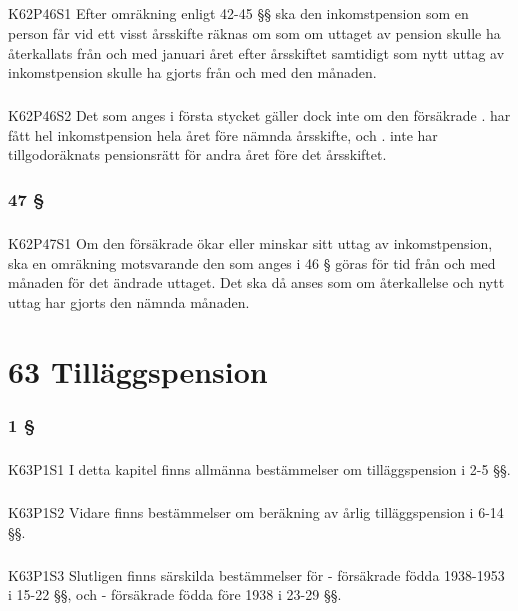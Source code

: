 \documentclass[a4paper,notitlepage,openany,10pt]{book}
\begin{document}
\paragraph*{}
{\tiny K62P46S1}
Efter omräkning enligt 42-45 §§ ska den inkomstpension som en person får vid ett visst årsskifte räknas om som om uttaget av pension skulle ha återkallats från och med januari året efter årsskiftet samtidigt som nytt uttag av inkomstpension skulle ha gjorts från och med den månaden.
\paragraph*{}
{\tiny K62P46S2}
Det som anges i första stycket gäller dock inte om den försäkrade
. har fått hel inkomstpension hela året före nämnda årsskifte, och
. inte har tillgodoräknats pensionsrätt för andra året före det årsskiftet.
\subsection*{47 §}
\paragraph*{}
{\tiny K62P47S1}
Om den försäkrade ökar eller minskar sitt uttag av inkomstpension, ska en omräkning motsvarande den som anges i 46 § göras för tid från och med månaden för det ändrade uttaget. Det ska då anses som om återkallelse och nytt uttag har gjorts den nämnda månaden.
\chapter*{63 Tilläggspension}
\subsection*{1 §}
\paragraph*{}
{\tiny K63P1S1}
I detta kapitel finns allmänna bestämmelser om tilläggspension i 2-5 §§.
\paragraph*{}
{\tiny K63P1S2}
Vidare finns bestämmelser om beräkning av årlig tilläggspension i 6-14 §§.
\paragraph*{}
{\tiny K63P1S3}
Slutligen finns särskilda bestämmelser för
\newline - försäkrade födda 1938-1953 i 15-22 §§, och
\newline - försäkrade födda före 1938 i 23-29 §§.
\end{document}
